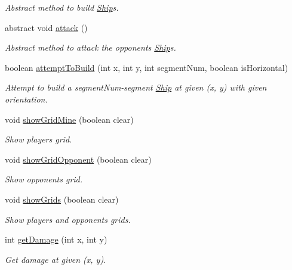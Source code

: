 \begin{DoxyCompactItemize}
\begin{DoxyCompactList}\small\item\em Abstract method to build \hyperlink{classShip}{Ship}\textquotesingle{}s. \end{DoxyCompactList}\item 
abstract void \hyperlink{classPlayer_abd852c2c1a9728644a45dd53a84871de}{attack} ()\hypertarget{classPlayer_abd852c2c1a9728644a45dd53a84871de}{}\label{classPlayer_abd852c2c1a9728644a45dd53a84871de}

\begin{DoxyCompactList}\small\item\em Abstract method to attack the opponent\textquotesingle{}s \hyperlink{classShip}{Ship}\textquotesingle{}s. \end{DoxyCompactList}\item 
boolean \hyperlink{classPlayer_a21c42ba135673c82075eebb3f9ea6d5c}{attempt\+To\+Build} (int x, int y, int segment\+Num, boolean is\+Horizontal)
\begin{DoxyCompactList}\small\item\em Attempt to build a segment\+Num-\/segment \hyperlink{classShip}{Ship} at given (x, y) with given orientation. \end{DoxyCompactList}\item 
void \hyperlink{classPlayer_ae551f266c116f22887d278f6beaf9e75}{show\+Grid\+Mine} (boolean clear)
\begin{DoxyCompactList}\small\item\em Show player\textquotesingle{}s grid. \end{DoxyCompactList}\item 
void \hyperlink{classPlayer_ade7e5623438ad21421091dcc201b367c}{show\+Grid\+Opponent} (boolean clear)
\begin{DoxyCompactList}\small\item\em Show opponent\textquotesingle{}s grid. \end{DoxyCompactList}\item 
void \hyperlink{classPlayer_ad571760f9739182566e3817e515fd3c1}{show\+Grids} (boolean clear)
\begin{DoxyCompactList}\small\item\em Show player\textquotesingle{}s and opponent\textquotesingle{}s grids. \end{DoxyCompactList}\item 
int \hyperlink{classPlayer_ac4e41793e0e2fd8cfaabad6775cdfaa0}{get\+Damage} (int x, int y)
\begin{DoxyCompactList}\small\item\em Get damage at given (x, y). \end{DoxyCompactList}\end{DoxyCompactItemize}


